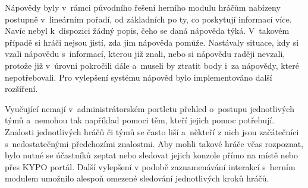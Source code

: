 \documentclass[
  digital, %
  oneside, %
  table,   %
  nolof,     %
  nolot,     %
]{fithesis3}
\begin{document}
Nápovědy byly v~rámci původního řešení herního modulu hráčům nabízeny postupně v~lineárním pořadí, od základních po ty, co poskytují informací více. Navíc nebyl k~dispozici žádný popis, čeho se daná nápověda týká. V~takovém případě si hráči nejsou jistí, zda jim nápověda pomůže. Nastávaly situace, kdy si vzali nápovědu s~informací, kterou již znali, nebo si nápovědu raději nevzali, protože již v~úrovni pokročili dále a~museli by ztratit body i~za nápovědy, které nepotřebovali. Pro vylepšení systému nápověd bylo implementováno další rozšíření.\par
Vyučující nemají v~administrátorském portletu přehled o~postupu jednotlivých týmů a~nemohou tak například pomoci těm, kteří jejich pomoc potřebují. Znalosti jednotlivých hráčů či týmů se často liší a~někteří z nich jsou začátečníci s~nedostatečnými předchozími znalostmi. Aby mohli takové hráče včas rozpoznat, bylo nutné se účastníků zeptat nebo sledovat jejich konzole přímo na místě nebo přes KYPO portál. Další vylepšení v podobě zaznamenávání interakcí s~herním modulem umožnilo alespoň omezené sledování jednotlivých kroků hráčů. \cite{ctfDesign}
\end{document}
